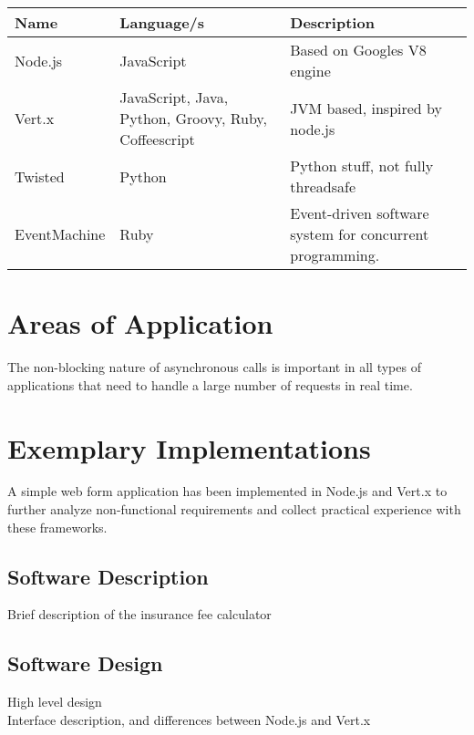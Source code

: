 \begin{table}[h]
\centering
\begin{tabular*}{\textwidth}{p{} p{} p{}}
\toprule
\textbf{Name} & \textbf{Language/s} & \textbf{Description} \\
\midrule
Node.js			& JavaScript		& Based on Googles V8 engine\\
Vert.x			& JavaScript, Java, Python, Groovy, Ruby, Coffeescript		
									& JVM based, inspired by node.js\\
Twisted			& Python			& Python stuff, not fully threadsafe\\
EventMachine	& Ruby				& Event-driven software system for concurrent programming.\\
\bottomrule 
\end{tabular*}
  \label{tab:existing_frameworks}
\end{table}



\section{Areas of Application}
\label{areas_of_application}

The non-blocking nature of asynchronous calls is important in all types of
applications that need to handle a large number of requests in real time.



\section{Exemplary Implementations}
\label{exemplary_implementations}

A simple web form application has been implemented in Node.js and Vert.x to
further analyze non-functional requirements and collect practical experience
with these frameworks.

\subsection{Software Description}
\label{software_description}
Brief description of the insurance fee calculator

\subsection{Software Design}
\label{software_design}
High level design\\
Interface description, and differences between Node.js and Vert.x

